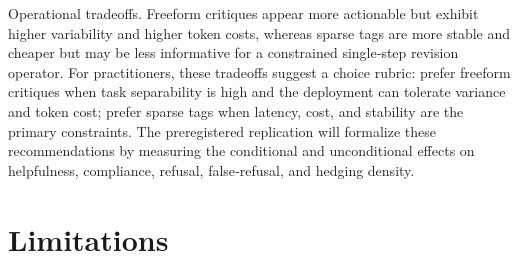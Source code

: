 \documentclass{article}
\begin{document}
Operational tradeoffs. Freeform critiques appear more actionable but exhibit higher variability and higher token costs, whereas sparse tags are more stable and cheaper but may be less informative for a constrained single‑step revision operator. For practitioners, these tradeoffs suggest a choice rubric: prefer freeform critiques when task separability is high and the deployment can tolerate variance and token cost; prefer sparse tags when latency, cost, and stability are the primary constraints. The preregistered replication will formalize these recommendations by measuring the conditional and unconditional effects on helpfulness, compliance, refusal, false‑refusal, and hedging density.

\section{Limitations}

\label{sec:limitations}
\end{document}
